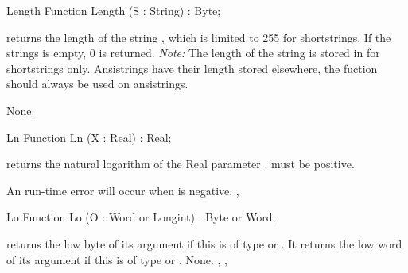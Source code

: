 \documentclass{report}
\begin{document}

\begin{function}{Length}
\Declaration
Function Length (S : String) : Byte;

\Description
{} returns the length of the string , which is limited 
to 255 for shortstrings. If the strings  is empty, 0 is returned.
{\em Note:} The length of the string  is stored in  for
shortstrings only. Ansistrings have their length stored elsewhere,
the  fuction should always be used on ansistrings.

\Errors
None.
\SeeAlso
{}
\end{function}


\begin{function}{Ln}
\Declaration
Function Ln (X : Real) : Real;

\Description

 returns the natural logarithm of the Real parameter .
 must be positive.

\Errors
An run-time error will occur when  is negative.
\SeeAlso
{}, 
\end{function}


\begin{function}{Lo}
\Declaration
Function Lo (O : Word or Longint) : Byte or Word;

\Description
{} returns the low byte of its argument if this is of type
 or
. It returns the low word of its argument if this is of type
 or .
\Errors
None.
\SeeAlso
{}, , 
\end{function}

\end{document}
